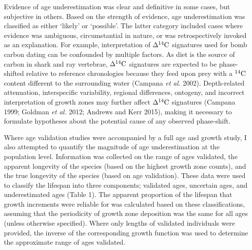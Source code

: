 \documentclass[]{article}
\begin{document}
Evidence of age underestimation was clear and definitive in some cases,
but subjective in others. Based on the strength of evidence, age
underestimation was classified as either `likely' or `possible'. The
latter category included cases where evidence was ambiguous,
circumstantial in nature, or was retrospectively invoked as an
explanation. For example, interpretation of \(\Delta^{14}\textup{C}\)
signatures used for bomb carbon dating can be confounded by multiple
factors. As diet is the source of carbon in shark and ray vertebrae,
\(\Delta^{14}\textup{C}\) signatures are expected to be phase-shifted
relative to reference chronologies because they feed upon prey with a
\(^{14}\textup{C}\) content different to the surrounding water (Campana
\emph{et al.} 2002). Depth-related attenuation, interspecific
variability, regional differences, ontogeny, and incorrect
interpretation of growth zones may further affect
\(\Delta^{14}\textup{C}\) signatures (Campana 1999; Goldman \emph{et
al.} 2012; Andrews and Kerr 2015), making it necessary to formulate
hypotheses about the potential cause of any observed phase-shift.

Where age validation studies were accompanied by a full age and growth
study, I also attempted to quantify the magnitude of age underestimation
at the population level. Information was collected on the range of ages
validated, the apparent longevity of the species (based on the highest
growth zone counts), and the true longevity of the species (based on age
validation). These data were used to classify the lifespan into three
components; validated ages, uncertain ages, and underestimated ages
(Table 1). The apparent proportion of the lifespan that growth
increments were reliable for was calculated based on these
classifications, assuming that the periodicity of growth zone deposition
was the same for all ages (unless otherwise specified). Where only
lengths of validated individuals were provided, the inverse of the
corresponding growth function was used to determine the approximate
range of ages validated.
\end{document}
